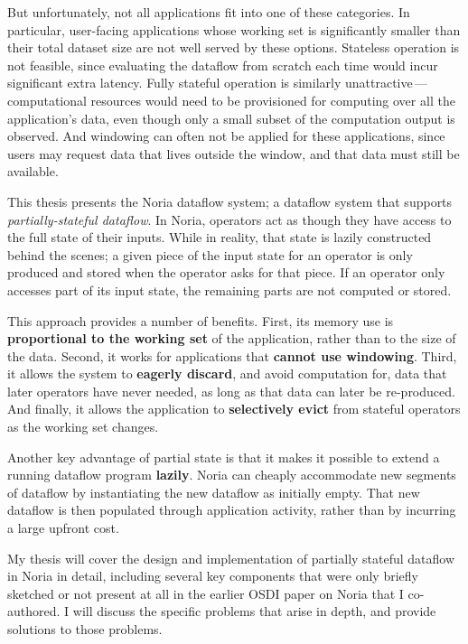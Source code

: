 \documentclass[12pt,letterpaper,twoside]{article}
\begin{document}
But unfortunately, not all applications fit into one of these categories. In
particular, user-facing applications whose working set is significantly smaller
than their total dataset size are not well served by these options. Stateless
operation is not feasible, since evaluating the dataflow from scratch each time
would incur significant extra latency. Fully stateful operation is similarly
unattractive\,---\, computational resources would need to be provisioned for
computing over all the application's data, even though only a small subset of
the computation output is observed. And windowing can often not be applied for
these applications, since users may request data that lives outside the window,
and that data must still be available.

This thesis presents the Noria dataflow system; a dataflow system that supports
\emph{partially-stateful dataflow}. In Noria, operators act as though they have
access to the full state of their inputs. While in reality, that state is lazily
constructed behind the scenes; a given piece of the input state for an operator
is only produced and stored when the operator asks for that piece. If an
operator only accesses part of its input state, the remaining parts are not
computed or stored.

This approach provides a number of benefits. First, its memory use is
\textbf{proportional to the working set} of the application, rather than to the
size of the data. Second, it works for applications that \textbf{cannot use
windowing}. Third, it allows the system to \textbf{eagerly discard}, and avoid
computation for, data that later operators have never needed, as long as that
data can later be re-produced. And finally, it allows the application to
\textbf{selectively evict} from stateful operators as the working set changes.

Another key advantage of partial state is that it makes it possible to extend a
running dataflow program \textbf{lazily}. Noria can cheaply accommodate new
segments of dataflow by instantiating the new dataflow as initially empty. That
new dataflow is then populated through application activity, rather than by
incurring a large upfront cost.

My thesis will cover the design and implementation of partially stateful
dataflow in Noria in detail, including several key components that were only
briefly sketched or not present at all in the earlier OSDI paper on
Noria\cite{noria} that I co-authored. I will discuss the specific problems that
arise in depth, and provide solutions to those problems.
\end{document}
